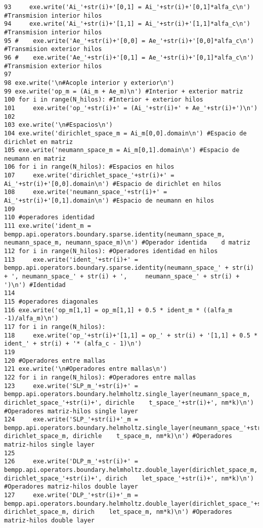 \documentclass[12pt,letterpaper]{article}
\numberwithin{equation}{section}
\begin{document}
\begin{lstlisting}
93     exe.write('Ai_'+str(i)+'[0,1] = Ai_'+str(i)+'[0,1]*alfa_c\n') #Transmision interior hilos
94     exe.write('Ai_'+str(i)+'[1,1] = Ai_'+str(i)+'[1,1]*alfa_c\n') #Transmision interior hilos
95 #    exe.write('Ae_'+str(i)+'[0,0] = Ae_'+str(i)+'[0,0]*alfa_c\n') #Transmision exterior hilos
96 #    exe.write('Ae_'+str(i)+'[0,1] = Ae_'+str(i)+'[0,1]*alfa_c\n') #Transmision exterior hilos
97 
98 exe.write('\n#Acople interior y exterior\n')
99 exe.write('op_m = (Ai_m + Ae_m)\n') #Interior + exterior matriz
100 for i in range(N_hilos): #Interior + exterior hilos
101     exe.write('op_'+str(i)+' = (Ai_'+str(i)+' + Ae_'+str(i)+')\n')
102 
103 exe.write('\n#Espacios\n')
104 exe.write('dirichlet_space_m = Ai_m[0,0].domain\n') #Espacio de dirichlet en matriz
105 exe.write('neumann_space_m = Ai_m[0,1].domain\n') #Espacio de neumann en matriz
106 for i in range(N_hilos): #Espacios en hilos
107     exe.write('dirichlet_space_'+str(i)+' = Ai_'+str(i)+'[0,0].domain\n') #Espacio de dirichlet en hilos
108     exe.write('neumann_space_'+str(i)+' = Ai_'+str(i)+'[0,1].domain\n') #Espacio de neumann en hilos
109 
110 #operadores identidad
111 exe.write('ident_m = bempp.api.operators.boundary.sparse.identity(neumann_space_m, neumann_space_m, neumann_space_m)\n') #Operador identida    d matriz
112 for i in range(N_hilos): #Operadores identidad en hilos
113     exe.write('ident_'+str(i)+' = bempp.api.operators.boundary.sparse.identity(neumann_space_' + str(i) + ', neumann_space_' + str(i) + ',     neumann_space_' + str(i) + ')\n') #Identidad
114 
115 #operadores diagonales
116 exe.write('op_m[1,1] = op_m[1,1] + 0.5 * ident_m * ((alfa_m -1)/alfa_m)\n')
117 for i in range(N_hilos):
118     exe.write('op_'+str(i)+'[1,1] = op_' + str(i) + '[1,1] + 0.5 * ident_' + str(i) + '* (alfa_c - 1)\n')
119 
120 #Operadores entre mallas
121 exe.write('\n#Operadores entre mallas\n')
122 for i in range(N_hilos): #Operadores entre mallas 
123     exe.write('SLP_m_'+str(i)+' = bempp.api.operators.boundary.helmholtz.single_layer(neumann_space_m, dirichlet_space_'+str(i)+', dirichle    t_space_'+str(i)+', nm*k)\n') #Operadores matriz-hilos single layer
124     exe.write('SLP_'+str(i)+'_m = bempp.api.operators.boundary.helmholtz.single_layer(neumann_space_'+str(i)+', dirichlet_space_m, dirichle    t_space_m, nm*k)\n') #Operadores matriz-hilos single layer
125 
126     exe.write('DLP_m_'+str(i)+' = bempp.api.operators.boundary.helmholtz.double_layer(dirichlet_space_m, dirichlet_space_'+str(i)+', dirich    let_space_'+str(i)+', nm*k)\n') #Operadores matriz-hilos double layer
127     exe.write('DLP_'+str(i)+'_m = bempp.api.operators.boundary.helmholtz.double_layer(dirichlet_space_'+str(i)+', dirichlet_space_m, dirich    let_space_m, nm*k)\n') #Operadores matriz-hilos double layer

\end{lstlisting}
\end{document}

